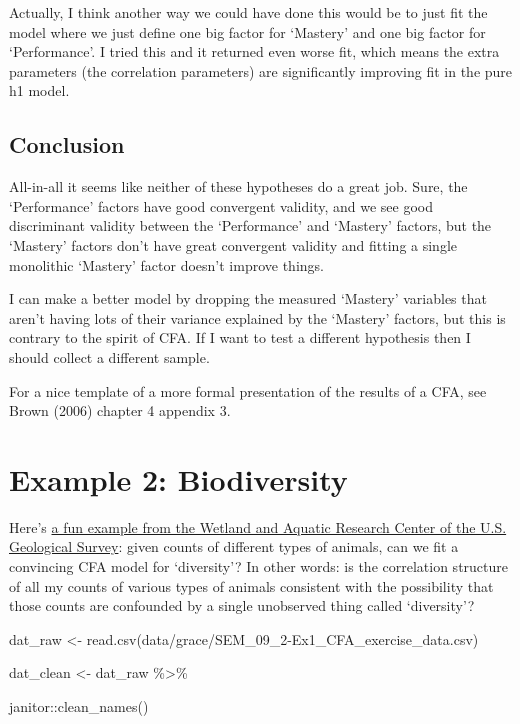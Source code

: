 \documentclass[
  letterpaper,
  DIV=11,
  numbers=noendperiod]{scrreprt}
\newenvironment{Shaded}{\begin{snugshade}}{\end{snugshade}}
\newcommand{\FunctionTok}[1]{\textcolor[rgb]{0.28,0.35,0.67}{#1}}
\newcommand{\NormalTok}[1]{\textcolor[rgb]{0.00,0.23,0.31}{#1}}
\newcommand{\OtherTok}[1]{\textcolor[rgb]{0.00,0.23,0.31}{#1}}
\newcommand{\SpecialCharTok}[1]{\textcolor[rgb]{0.37,0.37,0.37}{#1}}
\newcommand{\StringTok}[1]{\textcolor[rgb]{0.13,0.47,0.30}{#1}}
\begin{document}
Actually, I think another way we could have done this would be to just
fit the model where we just define one big factor for `Mastery' and one
big factor for `Performance'. I tried this and it returned even worse
fit, which means the extra parameters (the correlation parameters) are
significantly improving fit in the pure h1 model.

\hypertarget{conclusion}{%
\subsection*{Conclusion}\label{conclusion}}

All-in-all it seems like neither of these hypotheses do a great job.
Sure, the `Performance' factors have good convergent validity, and we
see good discriminant validity between the `Performance' and `Mastery'
factors, but the `Mastery' factors don't have great convergent validity
and fitting a single monolithic `Mastery' factor doesn't improve things.

I can make a better model by dropping the measured `Mastery' variables
that aren't having lots of their variance explained by the `Mastery'
factors, but this is contrary to the spirit of CFA. If I want to test a
different hypothesis then I should collect a different sample.

For a nice template of a more formal presentation of the results of a
CFA, see Brown (2006) chapter 4 appendix 3.

\hypertarget{example-2-biodiversity}{%
\section*{Example 2: Biodiversity}\label{example-2-biodiversity}}


Here's
\href{https://d9-wret.s3.us-west-2.amazonaws.com/assets/palladium/production/s3fs-public/atoms/files/SEM_09_2-Ex1_CFA_exercise.pdf}{a
fun example from the Wetland and Aquatic Research Center of the U.S.
Geological Survey}: given counts of different types of animals, can we
fit a convincing CFA model for `diversity'? In other words: is the
correlation structure of all my counts of various types of animals
consistent with the possibility that those counts are confounded by a
single unobserved thing called `diversity'?

\begin{Shaded}
\begin{Highlighting}[]
\NormalTok{dat\_raw }\OtherTok{\textless{}{-}} \FunctionTok{read.csv}\NormalTok{(}\StringTok{\textquotesingle{}data/grace/SEM\_09\_2{-}Ex1\_CFA\_exercise\_data.csv\textquotesingle{}}\NormalTok{)}

\NormalTok{dat\_clean }\OtherTok{\textless{}{-}}\NormalTok{ dat\_raw }\SpecialCharTok{\%\textgreater{}\%}  
  
\NormalTok{  janitor}\SpecialCharTok{::}\FunctionTok{clean\_names}\NormalTok{()}
\end{Highlighting}
\end{Shaded}
\end{document}
